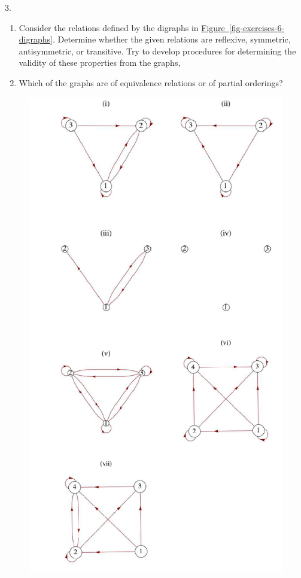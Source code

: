 \documentclass[10pt,]{book}
\theoremstyle{plain}
\theoremstyle{definition}
\theoremstyle{definition}
\theoremstyle{definition}
\theoremstyle{definition}
\begin{document}
\begin{exercisegroup}
%
\par\smallskip
\item[3.]\hypertarget{exercise-15}{}\leavevmode%
\begin{enumerate}[label=\alph*]
\item\hypertarget{li-46}{}Consider the relations defined by the digraphs in \hyperref[fig-exercises-6-digraphs]{Figure~\ref{fig-exercises-6-digraphs}}. Determine whether the given relations are reflexive, symmetric, antisymmetric,
or transitive. Try to develop procedures for determining the validity of these properties from the graphs, %
\item\hypertarget{li-47}{}Which of the graphs are of equivalence relations or of partial orderings?%
\end{enumerate}
%
\leavevmode%
\begin{figure}
\centering
\includegraphics[width=1\linewidth]{images/exercises-6-digraphs.png}

\end{figure}
\end{exercisegroup}
\end{document}

